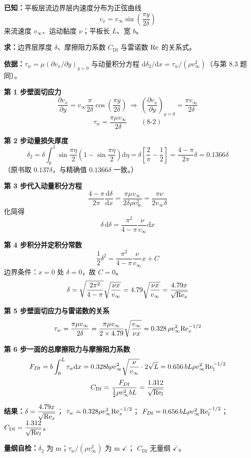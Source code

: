 \begin{jie}
\textbf{已知：}平板层流边界层内速度分布为正弦曲线
\[ v_x=v_\infty\sin\left(\frac{\pi y}{2\delta}\right) \]
来流速度 $v_\infty$、运动黏度 $\nu$；平板长 $L$、宽 $b$。

\textbf{求：}边界层厚度 $\delta$、摩擦阻力系数 $C_{\mathrm{Df}}$ 与雷诺数 $\mathrm{Re}$ 的关系式。

\textbf{依据：}$\tau_w=\mu\left(\partial v_x/\partial y\right)_{y=0}$ 与动量积分方程
$\mathrm{d}\delta_2/\mathrm{d}x=\tau_w/(\rho v_\infty^{2})$（与第 8.3 题同）。

\textbf{第 1 步\quad 壁面切应力}
\[ \frac{\partial v_x}{\partial y}=v_\infty\frac{\pi}{2\delta}\cos\left(\frac{\pi y}{2\delta}\right)
\ \Longrightarrow\ \left(\frac{\partial v_x}{\partial y}\right)_{y=0}=\frac{\pi v_\infty}{2\delta} \]
\[ \tau_w=\frac{\pi\mu v_\infty}{2\delta} \qquad (8\text{-}2) \]

\textbf{第 2 步\quad 动量损失厚度}
\[ \delta_2=\delta\int_0^{1}\sin\frac{\pi\eta}{2}\left(1-\sin\frac{\pi\eta}{2}\right)\mathrm{d}\eta
=\delta\left[\frac{2}{\pi}-\frac{1}{2}\right]=\frac{4-\pi}{2\pi}\delta=0.1366\delta \]
（原书取 $0.137\delta$，与精确值 $0.1366\delta$ 一致。）

\textbf{第 3 步\quad 代入动量积分方程}
\[ \frac{4-\pi}{2\pi}\frac{\mathrm{d}\delta}{\mathrm{d}x}
=\frac{\pi\mu v_\infty}{2\delta\rho v_\infty^{2}}=\frac{\pi\nu}{2v_\infty\delta} \]
化简得
\[ \delta\,\mathrm{d}\delta=\frac{\pi^{2}}{4-\pi}\frac{\nu}{v_\infty}\mathrm{d}x \]

\textbf{第 4 步\quad 积分并定积分常数}
\[ \frac{1}{2}\delta^{2}=\frac{\pi^{2}}{4-\pi}\frac{\nu}{v_\infty}x+C \]
边界条件：$x=0$ 处 $\delta=0$，故 $C=0$。
\[ \delta=\sqrt{\frac{2\pi^{2}}{4-\pi}}\sqrt{\frac{\nu x}{v_\infty}}
=4.79\sqrt{\frac{\nu x}{v_\infty}}=\frac{4.79x}{\sqrt{\mathrm{Re}_x}} \]

\textbf{第 5 步\quad 壁面切应力与雷诺数的关系}
\[ \tau_w=\frac{\pi\mu v_\infty}{2\delta}=\frac{\pi\mu v_\infty}{2\times4.79}\sqrt{\frac{v_\infty}{\nu x}}
=0.328\,\rho v_\infty^{2}\mathrm{Re}_x^{-1/2} \]

\textbf{第 6 步\quad 一面的总摩擦阻力与摩擦阻力系数}
\[ F_{D\mathrm{f}}=b\int_0^{L}\tau_w\mathrm{d}x
=0.328b\rho v_\infty^{2}\sqrt{\frac{\nu}{v_\infty}}\cdot2\sqrt{L}
=0.656\,bL\rho v_\infty^{2}\mathrm{Re}_l^{-1/2} \]
\[ C_{\mathrm{Df}}=\frac{F_{D\mathrm{f}}}{\frac{1}{2}\rho v_\infty^{2}bL}=\frac{1.312}{\sqrt{\mathrm{Re}_l}} \]

\textbf{结果：}$\delta=\dfrac{4.79x}{\sqrt{\mathrm{Re}_x}}$；
$\tau_w=0.328\rho v_\infty^{2}\mathrm{Re}_x^{-1/2}$；
$F_{D\mathrm{f}}=0.656\,bL\rho v_\infty^{2}\mathrm{Re}_l^{-1/2}$；
$C_{\mathrm{Df}}=\dfrac{1.312}{\sqrt{\mathrm{Re}_l}}$。

\textbf{量纲自检：}$\delta_2$ 为 $\mathrm{m}$；$\tau_w/(\rho v_\infty^{2})$ 为 $\mathrm{m}$ $\checkmark$；
$C_{\mathrm{Df}}$ 无量纲 $\checkmark$。
\end{jie}

